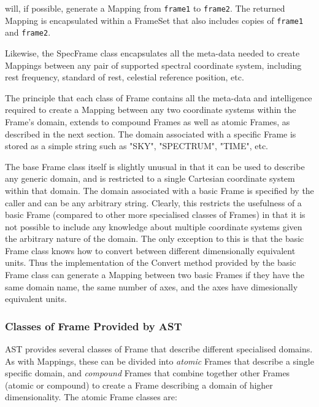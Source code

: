 \documentclass[final,authoryear,5p,times,twocolumn]{elsarticle}
\begin{document}
will, if possible, generate a Mapping from \texttt{frame1} to
\texttt{frame2}. The returned Mapping is encapsulated within a FrameSet that
also includes copies of \texttt{frame1} and \texttt{frame2}.

Likewise, the SpecFrame class encapsulates all the meta-data needed to
create Mappings between any pair of supported spectral coordinate system,
including rest frequency, standard of rest, celestial reference position,
etc.

The principle that each class of Frame contains all the meta-data and
intelligence required to create a Mapping between any two coordinate
systems within the Frame's domain, extends to compound Frames as well as
atomic Frames, as described in the next section. The domain associated
with a specific Frame is stored as a simple string such as "SKY",
"SPECTRUM", "TIME", etc.

The base Frame class itself is slightly unusual in that it can be used to
describe any generic domain, and is restricted to a single Cartesian
coordinate system within that domain. The domain associated with a basic
Frame is specified by the caller and can be any arbitrary string. Clearly,
this restricts the usefulness of a basic Frame (compared to other more
specialised classes of Frames) in that it is not possible to include any
knowledge about multiple coordinate systems given the arbitrary nature of
the domain. The only exception to this is that the basic Frame class
knows how to convert between different dimensionally equivalent units.
Thus the implementation of the Convert method provided by the basic Frame
class can generate a Mapping between two basic Frames if they have the
same domain name, the same number of axes, and the axes have dimesionally
equivalent units.

\subsubsection{Classes of Frame Provided by AST}
AST provides several classes of Frame that describe different specialised
domains. As with Mappings, these can be divided into \emph{atomic} Frames that
describe a single specific domain, and \emph{compound} Frames that combine
together other Frames (atomic or compound) to create a Frame describing a
domain of higher dimensionality. The atomic Frame classes are:
\end{document}
